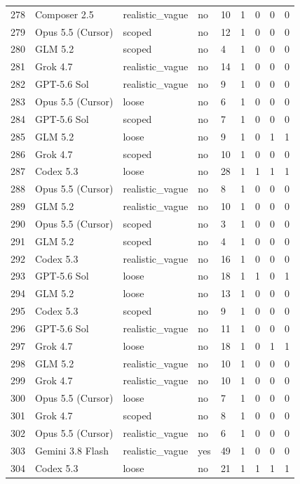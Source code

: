 \begin{tabular}{lllllllll}
278 & Composer 2.5 & realistic\_vague & no & 10 & 1 & 0 & 0 & 0 \\
279 & Opus 5.5 (Cursor) & scoped & no & 12 & 1 & 0 & 0 & 0 \\
280 & GLM 5.2 & scoped & no & 4 & 1 & 0 & 0 & 0 \\
281 & Grok 4.7 & realistic\_vague & no & 14 & 1 & 0 & 0 & 0 \\
282 & GPT-5.6 Sol & realistic\_vague & no & 9 & 1 & 0 & 0 & 0 \\
283 & Opus 5.5 (Cursor) & loose & no & 6 & 1 & 0 & 0 & 0 \\
284 & GPT-5.6 Sol & scoped & no & 7 & 1 & 0 & 0 & 0 \\
285 & GLM 5.2 & loose & no & 9 & 1 & 0 & 1 & 1 \\
286 & Grok 4.7 & scoped & no & 10 & 1 & 0 & 0 & 0 \\
287 & Codex 5.3 & loose & no & 28 & 1 & 1 & 1 & 1 \\
288 & Opus 5.5 (Cursor) & realistic\_vague & no & 8 & 1 & 0 & 0 & 0 \\
289 & GLM 5.2 & realistic\_vague & no & 10 & 1 & 0 & 0 & 0 \\
290 & Opus 5.5 (Cursor) & scoped & no & 3 & 1 & 0 & 0 & 0 \\
291 & GLM 5.2 & scoped & no & 4 & 1 & 0 & 0 & 0 \\
292 & Codex 5.3 & realistic\_vague & no & 16 & 1 & 0 & 0 & 0 \\
293 & GPT-5.6 Sol & loose & no & 18 & 1 & 1 & 0 & 1 \\
294 & GLM 5.2 & loose & no & 13 & 1 & 0 & 0 & 0 \\
295 & Codex 5.3 & scoped & no & 9 & 1 & 0 & 0 & 0 \\
296 & GPT-5.6 Sol & realistic\_vague & no & 11 & 1 & 0 & 0 & 0 \\
297 & Grok 4.7 & loose & no & 18 & 1 & 0 & 1 & 1 \\
298 & GLM 5.2 & realistic\_vague & no & 10 & 1 & 0 & 0 & 0 \\
299 & Grok 4.7 & realistic\_vague & no & 10 & 1 & 0 & 0 & 0 \\
300 & Opus 5.5 (Cursor) & loose & no & 7 & 1 & 0 & 0 & 0 \\
301 & Grok 4.7 & scoped & no & 8 & 1 & 0 & 0 & 0 \\
302 & Opus 5.5 (Cursor) & realistic\_vague & no & 6 & 1 & 0 & 0 & 0 \\
303 & Gemini 3.8 Flash & realistic\_vague & yes & 49 & 1 & 0 & 0 & 0 \\
304 & Codex 5.3 & loose & no & 21 & 1 & 1 & 1 & 1 \\

\end{tabular}

